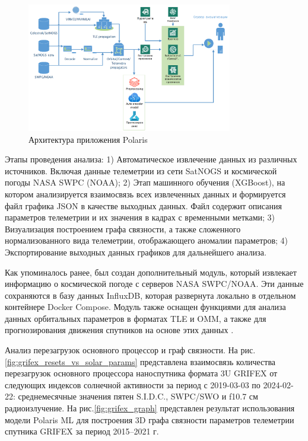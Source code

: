 \documentclass[12pt, a4paper]{extreport}
\begin{document}
\begin{figure}[htbp]
    \centering
    \includegraphics[width=0.8\textwidth]{polaris_architecture.png}
    \caption{Архитектура приложения Polaris}
    \label{fig:polaris_architecture}
\end{figure}

Этапы проведения анализа: 1) Автоматическое извлечение данных из различных источников. Включая данные телеметрии из сети SatNOGS и космической погоды NASA SWPC (NOAA); 2) Этап машинного обучения \cite{xgboost}\cite{boumghar2018enhanced} (XGBoost), на котором анализируется взаимосвязь всех извлеченных данных и формируется файл графика JSON в качестве выходных данных. Файл содержит описания параметров телеметрии и их значения в кадрах с временными метками; 3) Визуализация построением графа связности, а также сложенного нормализованного вида телеметрии, отображающего аномалии параметров; 4) Экспортирование выходных данных графиков для дальнейшего анализа.

Как упоминалось ранее, был создан дополнительный модуль, который извлекает информацию о космической погоде с серверов NASA SWPC/NOAA. Эти данные сохраняются в базу данных InfluxDB, которая развернута локально в отдельном контейнере Docker Compose. Модуль также оснащен функциями для анализа данных орбитальных параметров в форматах TLE и OMM, а также для прогнозирования движения спутников на основе этих данных \cite{bottou1991stochastic}\cite{killick2012optimal}.

Анализ перезагрузок основного процессор и граф связности. На рис.\ref{fig:grifex_resets_vs_solar_params} представлена взаимосвязь количества перезагрузок основного процессора наноспутника формата 3U GRIFEX от следующих индексов солнечной активности за период с 2019-03-03 по 2024-02-22: среднемесячные значения пятен S.I.D.C., SWPC/SWO и f10.7 см радиоизлучение. На рис.\ref{fig:grifex_graph} представлен результат использования модели Polaris ML для построения 3D графа связности параметров телеметрии спутника GRIFEX за период 2015–2021 г.
\end{document}
